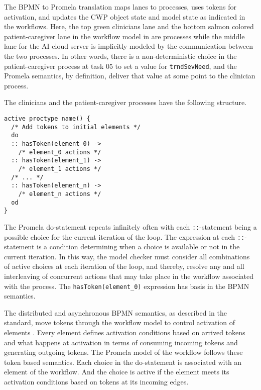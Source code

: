 The BPMN to Promela translation maps lanes to processes, uses tokens for activation, and updates the CWP object state and model state as indicated in the workflows.
Here, the top green clinicians lane and the bottom salmon colored patient-caregiver lane in the workflow model in  are processes while the middle lane for the AI cloud server is implicitly modeled by the communication between the two processes.
In other words, there is a non-deterministic choice in the patient-caregiver process at task 05 to set a value for \texttt{trndSevNeed}, and the Promela semantics, by definition, deliver that value at some point to the clinician process.

The clinicians and the patient-caregiver processes have the following structure.
%
{\small
\begin{lstlisting}[style=myPromela]
active proctype name() {
  /* Add tokens to initial elements */
  do
  :: hasToken(element_0) ->
    /* element_0 actions */
  :: hasToken(element_1) ->
    /* element_1 actions */
  /* ... */  
  :: hasToken(element_n) ->
    /* element_n actions */
  od
}
\end{lstlisting}
}
%
\noindent The Promela do-statement repeats infinitely often with each \texttt{::}-statement being a possible choice for the current iteration of the loop.
The expression at each \texttt{::}-statement is a condition determining when a choice is available or not in the current iteration.
In this way, the model checker must consider all combinations of active choices at each iteration of the loop, and thereby, resolve any and all interleaving of concurrent actions that may take place in the workflow associated with the process.
The \texttt{hasToken(element\_0)} expression has basis in the BPMN semantics.

The distributed and asynchronous BPMN semantics, as described in the standard, move tokens through the workflow model to control activation of elements \cite{BPMNSpecification}.
Every element defines activation conditions based on arrived tokens and what happens at activation in terms of consuming incoming tokens and generating outgoing tokens.
The Promela model of the workflow follows these token based semantics.
Each choice in the do-statement is associated with an element of the workflow.
And the choice is active if the element meets its activation conditions based on tokens at its incoming edges.

